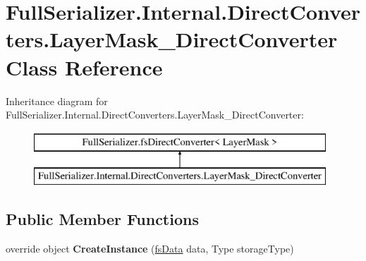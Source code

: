 \hypertarget{class_full_serializer_1_1_internal_1_1_direct_converters_1_1_layer_mask___direct_converter}{}\section{Full\+Serializer.\+Internal.\+Direct\+Converters.\+Layer\+Mask\+\_\+\+Direct\+Converter Class Reference}
\label{class_full_serializer_1_1_internal_1_1_direct_converters_1_1_layer_mask___direct_converter}
Inheritance diagram for Full\+Serializer.\+Internal.\+Direct\+Converters.\+Layer\+Mask\+\_\+\+Direct\+Converter\+:\begin{figure}[H]
\begin{center}
\leavevmode
\includegraphics[height=2.000000cm]{class_full_serializer_1_1_internal_1_1_direct_converters_1_1_layer_mask___direct_converter}
\end{center}
\end{figure}
\subsection*{Public Member Functions}
\begin{DoxyCompactItemize}
\item 
\mbox{\label{class_full_serializer_1_1_internal_1_1_direct_converters_1_1_layer_mask___direct_converter_a137b60e8c056f96e17449e04ad563f67}} 
override object {\bfseries Create\+Instance} (\hyperlink{class_full_serializer_1_1fs_data}{fs\+Data} data, Type storage\+Type)
\end{DoxyCompactItemize}
